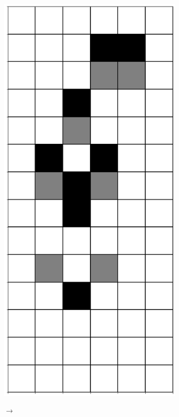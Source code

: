 \documentclass[12pt]{article}
\numberwithin{figure}{section} %
\begin{document}
\begin{figure}[H]
\begin{subfigure}{0.3\textwidth}
     		\subcaption{}
   	\end{subfigure}
        \begin{subfigure}{0.3\textwidth}
     		\centering
     		\includegraphics[angle=270,width=\linewidth]{Section4/7.2}
     		\subcaption{}
   	\end{subfigure}
	\begin{subfigure}[t]{0.03\textwidth}
      		{\LARGE$\xrightarrow{}$}
	\end{subfigure}
   

\end{figure}
\end{document}
